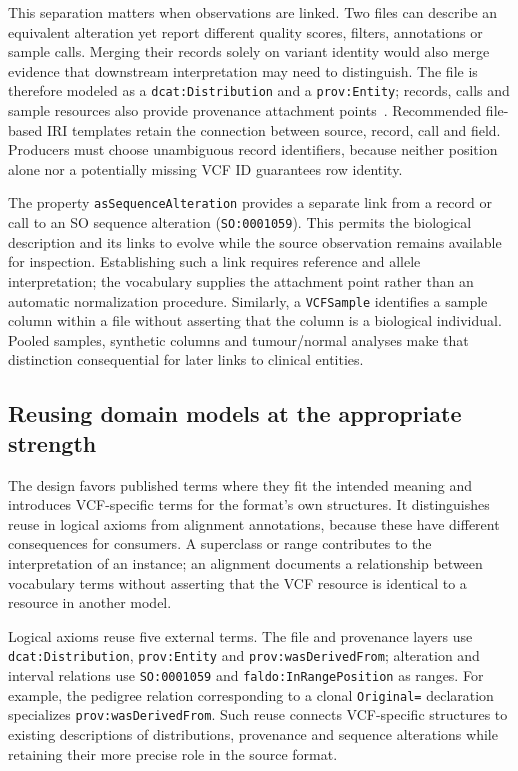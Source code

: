 \documentclass{ceurart}
\newcommand{\term}[1]{\texttt{#1}}
\begin{document}
This separation matters when observations are linked. Two files can describe an equivalent alteration yet report different quality scores, filters, annotations or sample calls. Merging their records solely on variant identity would also merge evidence that downstream interpretation may need to distinguish. The file is therefore modeled as a \term{dcat:Distribution} and a \term{prov:Entity}; records, calls and sample resources also provide provenance attachment points~\cite{prov2013}. Recommended file-based IRI templates retain the connection between source, record, call and field. Producers must choose unambiguous record identifiers, because neither position alone nor a potentially missing VCF ID guarantees row identity.

The property \term{asSequenceAlteration} provides a separate link from a record or call to an SO sequence alteration (\term{SO:0001059}). This permits the biological description and its links to evolve while the source observation remains available for inspection. Establishing such a link requires reference and allele interpretation; the vocabulary supplies the attachment point rather than an automatic normalization procedure. Similarly, a \term{VCFSample} identifies a sample column within a file without asserting that the column is a biological individual. Pooled samples, synthetic columns and tumour/normal analyses make that distinction consequential for later links to clinical entities.

\subsection{Reusing domain models at the appropriate strength}
\label{sec:reuse}

The design favors published terms where they fit the intended meaning and introduces VCF-specific terms for the format's own structures. It distinguishes reuse in logical axioms from alignment annotations, because these have different consequences for consumers. A superclass or range contributes to the interpretation of an instance; an alignment documents a relationship between vocabulary terms without asserting that the VCF resource is identical to a resource in another model.

Logical axioms reuse five external terms. The file and provenance layers use \term{dcat:Distribution}, \term{prov:Entity} and \term{prov:wasDerivedFrom}; alteration and interval relations use \term{SO:0001059} and \term{faldo:InRangePosition} as ranges. For example, the pedigree relation corresponding to a clonal \term{Original=} declaration specializes \term{prov:wasDerivedFrom}. Such reuse connects VCF-specific structures to existing descriptions of distributions, provenance and sequence alterations while retaining their more precise role in the source format.
\end{document}
